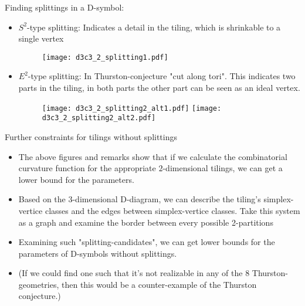 \begin{frame}
  Finding splittings in a D-symbol:
  \begin{itemize}
    \item $S^2$-type splitting: Indicates a detail in the tiling, which is
      shrinkable to a single vertex
      \begin{figure}
	\center
	\texttt{[image: d3c3\_2\_splitting1.pdf]}
      \end{figure}
    \item $E^2$-type splitting: In Thurston-conjecture "cut along tori". This
      indicates two parts in the tiling, in both parts the other part
      can be seen as an ideal vertex. 
      \begin{figure}
	\center
	\texttt{[image: d3c3\_2\_splitting2\_alt1.pdf]}
	\hspace{0.1\textwidth}
	\texttt{[image: d3c3\_2\_splitting2\_alt2.pdf]}
      \end{figure}
  \end{itemize}
\end{frame}

\begin{frame}
  Further constraints for tilings without splittings
  \begin{itemize}
    \item The above figures and remarks show that if we calculate the
      combinatorial curvature function for the appropriate $2$-dimensional
      tilings, we can get a lower bound for the parameters.
    \item Based on the $3$-dimensional D-diagram, we can describe the tiling's
      simplex-vertice classes and the edges between simplex-vertice classes.
      Take this system as a graph and examine the border between every possible
      2-partitions 
    \item Examining such "splitting-candidates", we can get lower bounds
      for the parameters of D-symbols without splittings. 
    \item (If we could find one such that it's not realizable in any of the 8
      Thurston-geometries, then this would be a counter-example of the Thurston
      conjecture.)
  \end{itemize}
\end{frame}

